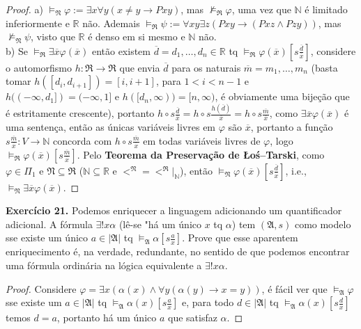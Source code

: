 \documentclass[11pt]{article}
\newcommand{\mf}[1]{\mathfrak{#1}}
\newcommand{\mbb}[1]{\mathbb{#1}}
\begin{document}
\begin{proof}
    a) $\vDash_\mf{N}\varphi:=\exists x\forall y(x\neq y\to Pxy)$, mas $\nvDash_\mf{R}\varphi$, uma vez que $\mbb{N}$ é limitado inferiormente e $\mbb{R}$ não. Ademais $\vDash_\mf{R}\psi:=\forall xy\exists z(Pxy\to(Pxz\wedge Pzy))$, mas $\nvDash_\mf{N}\psi$, visto que $\mbb{R}$ é denso em si mesmo e $\mbb{N}$ não.\\
    b) Se $\vDash_\mf{R}\exists\overline{x}\varphi(\overline{x})$ então existem $\overline{d}=d_1,\dots,d_n\in\mbb{R}$ tq $\vDash_\mf{R}\varphi(\overline{x})\left[s\tfrac{\overline{d}}{\overline{x}}\right]$, considere o automorfismo $h:\mf{R}\to\mf{R}$ que envia $\overline{d}$ para os naturais $\overline{m}=m_1,\dots,m_n$ (basta tomar $h([d_i,d_{i+1}])=[i,i+1]$, para $1<i<n-1$ e $h((-\infty,d_1])=(-\infty,1]$ e $h([d_n,\infty))=[n,\infty)$, é obviamente uma bijeção que é estritamente crescente), portanto $h\circ s\tfrac{\overline{d}}{\overline{x}}=h\circ s\tfrac{h(\overline{d})}{\overline{x}}=h\circ s\tfrac{\overline{m}}{\overline{x}}$, como $\exists\overline{x}\varphi(\overline{x})$ é uma sentença, então as únicas variáveis livres em $\varphi$ são $\overline{x}$, portanto a função $s\tfrac{\overline{m}}{\overline{x}}:V\to\mbb{N}$ concorda com $h\circ s\tfrac{\overline{m}}{\overline{x}}$ em todas variáveis livres de $\varphi$, logo $\vDash_\mf{R}\varphi(\overline{x})\left[s\frac{\overline{m}}{\overline{x}}\right]$. Pelo \textbf{Teorema da Preservação de Łoś–Tarski}, como $\varphi\in\Pi_1$ e $\mf{N}\subseteq\mf{R}$ ($\mbb{N}\subseteq\mbb{R}$ e $<^\mf{N}=<^\mf{R}\vert_{\mbb{N}}$), então $\vDash_\mf{N}\varphi(\overline{x})\left[s\tfrac{\overline{d}}{\overline{x}}\right]$, i.e., $\vDash_\mf{N}\exists\overline{x}\varphi(\overline{x})$.
\end{proof}

\begin{shaded}
\textbf{Exercício 21.} Podemos enriquecer a linguagem adicionando um quantificador adicional. A fórmula $\exists!x\alpha$ (lê-se "há um único $x$ tq $\alpha$) tem $(\mf{A},s)$ como modelo sse existe um único $a\in|\mf{A}|$ tq $\vDash_\mf{A}\alpha\left[s\tfrac{a}{x}\right]$. Prove que esse aparentem enriquecimento é, na verdade, redundante, no sentido de que podemos encontrar uma fórmula ordinária na lógica equivalente a $\exists!x\alpha$.
\end{shaded}

\begin{proof}
    Considere $\varphi=\exists x(\alpha(x)\wedge\forall y(\alpha(y)\to x=y))$, é fácil ver que $\vDash_\mf{A}\varphi$ sse existe um $a\in|\mf{A}|$ tq $\vDash_\mf{A}\alpha(x)\left[s\frac{a}{x}\right]$ e, para todo $d\in|\mf{A}|$ tq $\vDash_\mf{A}\alpha(x)\left[s\frac{d}{x}\right]$ temos $d=a$, portanto há um único $a$ que satisfaz $\alpha$.
\end{proof}
\end{document}
